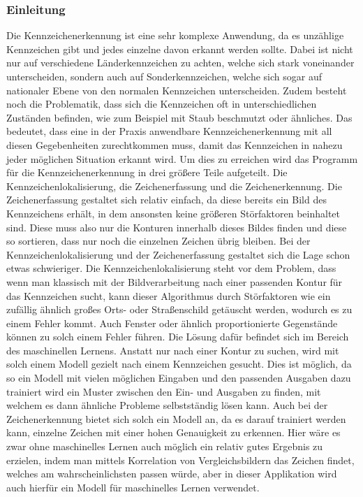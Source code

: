 \subsubsection{Einleitung}
Die Kennzeichenerkennung ist eine sehr komplexe Anwendung, da es unzählige Kennzeichen gibt und jedes einzelne davon erkannt werden sollte. 
Dabei ist nicht nur auf verschiedene Länderkennzeichen zu achten, welche sich stark voneinander unterscheiden, sondern auch auf Sonderkennzeichen, 
welche sich sogar auf nationaler Ebene von den normalen Kennzeichen unterscheiden. Zudem besteht noch die Problematik, dass sich die Kennzeichen 
oft in unterschiedlichen Zuständen befinden, wie zum Beispiel mit Staub beschmutzt oder ähnliches. Das bedeutet, dass eine in der Praxis 
anwendbare Kennzeichenerkennung mit all diesen Gegebenheiten zurechtkommen muss, damit das Kennzeichen in nahezu jeder möglichen Situation 
erkannt wird. Um dies zu erreichen wird das Programm für die Kennzeichenerkennung in drei größere Teile aufgeteilt. Die Kennzeichenlokalisierung, 
die Zeichenerfassung und die Zeichenerkennung. Die Zeichenerfassung gestaltet sich relativ einfach, da diese bereits ein Bild des Kennzeichens erhält, 
in dem ansonsten keine größeren Störfaktoren beinhaltet sind. Diese muss also nur die Konturen innerhalb dieses Bildes finden und diese so sortieren, 
dass nur noch die einzelnen Zeichen übrig bleiben. Bei der Kennzeichenlokalisierung und der Zeichenerfassung gestaltet sich die Lage schon etwas schwieriger. 
Die Kennzeichenlokalisierung steht vor dem Problem, dass wenn man klassisch mit der Bildverarbeitung nach einer passenden Kontur für das Kennzeichen sucht, 
kann dieser Algorithmus durch Störfaktoren wie ein zufällig ähnlich großes Orts- oder Straßenschild getäuscht werden, wodurch es zu einem Fehler kommt. 
Auch Fenster oder ähnlich proportionierte Gegenstände können zu solch einem Fehler führen. Die Lösung dafür befindet sich im Bereich des maschinellen Lernens. 
Anstatt nur nach einer Kontur zu suchen, wird mit solch einem Modell gezielt nach einem Kennzeichen gesucht. Dies ist möglich, da so ein Modell mit vielen 
möglichen Eingaben und den passenden Ausgaben dazu trainiert wird ein Muster zwischen den Ein- und Ausgaben zu finden, mit welchem es dann ähnliche Probleme 
selbstständig lösen kann. Auch bei der Zeichenerkennung bietet sich solch ein Modell an, da es darauf trainiert werden kann, einzelne Zeichen mit einer 
hohen Genauigkeit zu erkennen. Hier wäre es zwar ohne maschinelles Lernen auch möglich ein relativ gutes Ergebnis zu erzielen, indem man mittels Korrelation 
von Vergleichsbildern das Zeichen findet, welches am wahrscheinlichsten passen würde, aber in dieser Applikation wird auch hierfür ein Modell für maschinelles Lernen verwendet.

